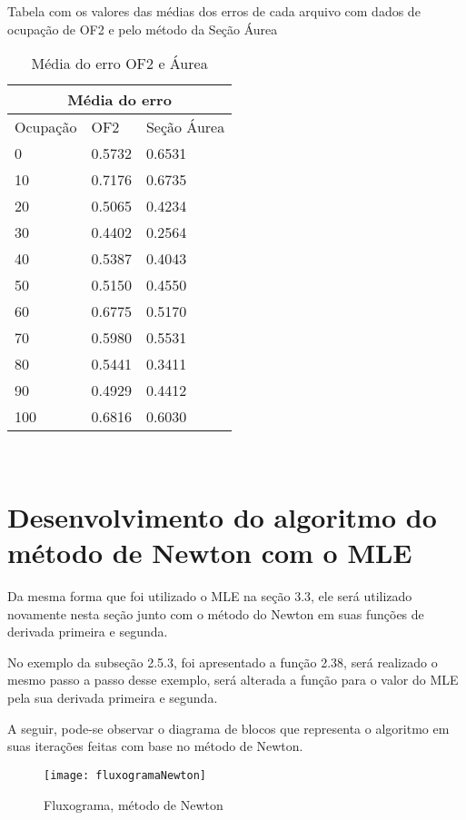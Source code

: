 Tabela com os valores das médias dos erros de cada arquivo com dados de ocupação de OF2 e pelo método da Seção Áurea\\

\begin{table}[htb]
\centering
\ABNTEXfontereduzida
\caption[Média do erro OF2 e Áurea]{Média do erro OF2 e Áurea}
\label{media-do-erro-aurea}
\begin{tabular}{ |p{3cm}|p{3cm}|p{3cm}|  }
\hline
\multicolumn{3}{|c|}{Média do erro} \\
\hline
Ocupação & OF2 & Seção Áurea\\
\hline
 0 & 0.5732 & 0.6531\\
 10 & 0.7176 & 0.6735\\
 20 & 0.5065 & 0.4234\\
 30 & 0.4402 & 0.2564\\
 40 & 0.5387 & 0.4043\\
 50 & 0.5150 & 0.4550\\
 60 & 0.6775 & 0.5170\\
 70 & 0.5980 & 0.5531\\
 80 & 0.5441 & 0.3411\\
 90 & 0.4929 & 0.4412\\
 100 & 0.6816 & 0.6030\\
\hline
\end{tabular}\\
\end{table}

\section{Desenvolvimento do algoritmo do método de Newton com o MLE}
\label{algoritmoMLE}

Da mesma forma que foi utilizado o MLE na seção 3.3, ele será utilizado novamente nesta seção junto com o método do Newton em suas funções de derivada primeira e segunda.

No exemplo da subseção 2.5.3, foi apresentado a função 2.38, será realizado o mesmo passo a passo desse exemplo, será alterada a função para o valor do MLE pela sua derivada primeira e segunda.

A seguir, pode-se observar o diagrama de blocos que representa o algoritmo em suas iterações feitas com base no método de Newton.

\begin{figure}[H]
    \centering
    \caption{Fluxograma, método de Newton}
    \texttt{[image: fluxogramaNewton]}
    \label{modeloNfce}
\end{figure}

